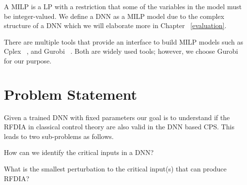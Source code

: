 A \ac{MILP} is a \ac{LP} with a restriction that some of the variables in the model must be integer-valued. 
We define a \ac{DNN} as a \ac{MILP} model due to the complex structure of a \ac{DNN} which we will elaborate more in Chapter ~\ref{evaluation}. 

There are multiple tools that provide an interface to build \ac{MILP} models such as Cplex ~\cite{cplex}, and Gurobi ~\cite{gurobi}.
Both are widely used tools; however, we choose Gurobi for our purpose. 



\section{Problem Statement}
\label{problemstatement}

Given a trained DNN with fixed parameters our goal is to understand if the  \ac*{RFDIA} in classical control theory are also valid in the DNN based CPS.
This leads to two sub-problems as follows.

\begin{problem}
	How can we identify the critical inputs in a DNN?
\end{problem}

\begin{problem}
	What is the smallest perturbation to the critical input(s) that can produce \ac{RFDIA}?
\end{problem}




